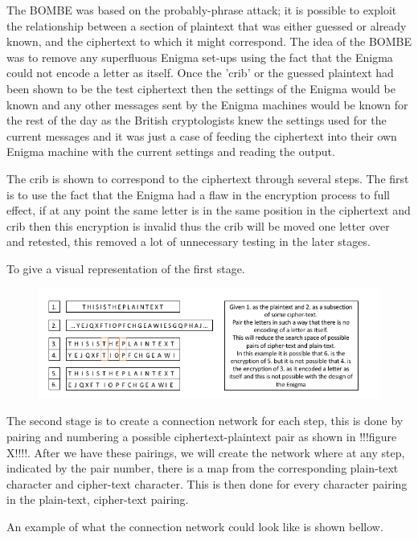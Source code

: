 \documentclass[12pt,a4paper]{article}
\begin{document}
The BOMBE was based on the probably-phrase attack; it is possible to exploit the relationship between a section of plaintext that was either guessed or already known, and the ciphertext to which it might correspond. The idea of the BOMBE was to remove any superfluous Enigma set-ups using the fact that the Enigma could not encode a letter as itself. Once the 'crib' or the guessed plaintext had been shown to be the test ciphertext then the settings of the Enigma would be known and any other messages sent by the Enigma machines would be known for the rest of the day as the British cryptologists knew the settings used for the current messages and it was just a case of feeding the ciphertext into their own Enigma machine with the current settings and reading the output.

The crib is shown to correspond to the ciphertext through several steps. The first is to use the fact that the Enigma had a flaw in the encryption process to full effect, if at any point the same letter is in the same position in the ciphertext and crib then this encryption is invalid thus the crib will be moved one letter over and retested, this removed a lot of unnecessary testing in the later stages. 

To give a visual representation of the first stage.

\begin{figure}[h]
\centering
\includegraphics[width=\textwidth]{StageOneBOMBE.png}
\end{figure}

The second stage is to create a connection network for each step, this is done by pairing and numbering a possible ciphertext-plaintext pair as shown in !!!figure X!!!!. After we have these pairings, we will create the network where at any step, indicated by the pair number, there is a map from the corresponding plain-text character and cipher-text character. This is then done for every character pairing in the plain-text, cipher-text pairing.

An example of what the connection network could look like is shown bellow.
\end{document}
